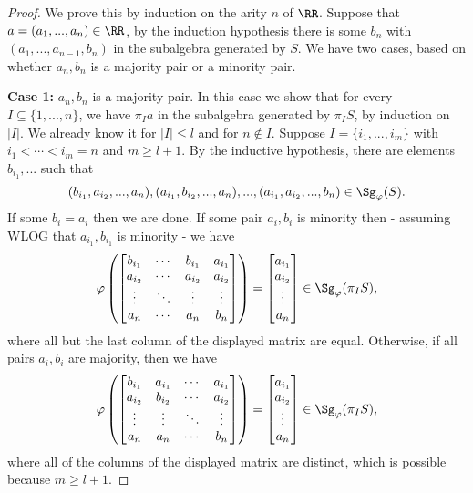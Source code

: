 \begin{proof} We prove this by induction on the arity $n$ of $\RR$. Suppose that $a = (a_1, ..., a_n) \in \RR$, by the induction hypothesis there is some $b_n$ with $(a_1, ..., a_{n-1}, b_n)$ in the subalgebra generated by $S$. We have two cases, based on whether $a_n,b_n$ is a majority pair or a minority pair.

{\bf Case 1: }$a_n,b_n$ is a majority pair. In this case we show that for every $I \subseteq \{1, ..., n\}$, we have $\pi_I a$ in the subalgebra generated by $\pi_I S$, by induction on $|I|$. We already know it for $|I| \le l$ and for $n \not\in I$. Suppose $I = \{i_1, ..., i_m\}$ with $i_1 < \cdots < i_m = n$ and $m \ge l+1$. By the inductive hypothesis, there are elements $b_{i_1}, ...$ such that
\[
(b_{i_1},a_{i_2},...,a_n), (a_{i_1}, b_{i_2}, ..., a_n), ..., (a_{i_1}, a_{i_2}, ..., b_n) \in \Sg_\varphi(S).
\]
If some $b_i = a_i$ then we are done. If some pair $a_i,b_i$ is minority then - assuming WLOG that $a_{i_1}, b_{i_1}$ is minority - we have
\[
\varphi\left(\begin{bmatrix} b_{i_1} & \cdots & b_{i_1} & a_{i_1}\\ a_{i_2} & \cdots & a_{i_2} & a_{i_2}\\ \vdots & \ddots & \vdots & \vdots\\ a_n & \cdots & a_n & b_n\end{bmatrix}\right) = \begin{bmatrix} a_{i_1}\\ a_{i_2}\\ \vdots\\ a_n\end{bmatrix} \in \Sg_\varphi(\pi_I S),
\]
where all but the last column of the displayed matrix are equal. Otherwise, if all pairs $a_i,b_i$ are majority, then we have
\[
\varphi\left(\begin{bmatrix} b_{i_1} & a_{i_1} & \cdots & a_{i_1}\\ a_{i_2} & b_{i_2} & \cdots & a_{i_2}\\ \vdots & \vdots & \ddots & \vdots\\ a_n & a_n & \cdots & b_n\end{bmatrix}\right) = \begin{bmatrix} a_{i_1}\\ a_{i_2}\\ \vdots\\ a_n\end{bmatrix} \in \Sg_\varphi(\pi_I S),
\]
where all of the columns of the displayed matrix are distinct, which is possible because $m \ge l+1$.


\end{proof}
